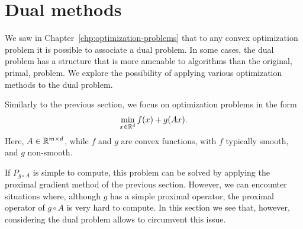      \section{Dual methods}
 
     We saw in Chapter~\ref{chp:optimization-problems} that to any convex optimization problem it is possible to associate a dual problem.
     In some cases, the dual problem has a structure that is more amenable to algorithms than the original, primal, problem. We explore the possibility of applying various optimization methods to the dual problem.
 
     Similarly to the previous section, we focus on optimization problems in the form
     \begin{equation}
         \label{eq:f+gA-dual}
         \min_{x\in\mathbb{R}^d} f(x) + g(Ax).
     \end{equation}
     Here,  $A\in \mathbb{R}^{m\times d}$, while $f$ and $g$ are convex functions, with $f$ typically smooth, and $g$ non-smooth.
 
     If $P_{g\circ A}$ is simple to compute, this problem can be solved by applying the proximal gradient method of the previous section.
     However, we can encounter situations where, although $g$ has a simple proximal operator, the proximal operator of ${g\circ A}$ is very hard to compute.
     In this section we see that, however, considering the dual problem allows to circumvent this issue.
 
 
